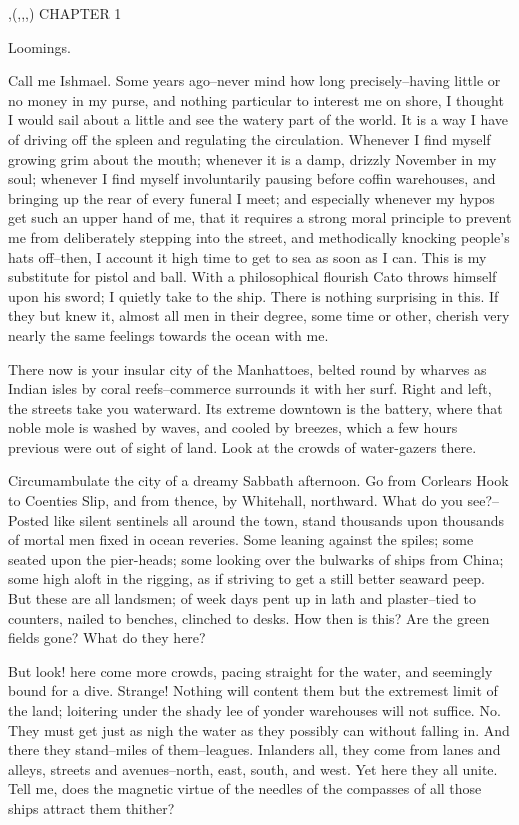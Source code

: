 \fontfam[LMfonts]

\grid \parindent ,\baselineskip(,,,) %
CHAPTER 1

Loomings.

Call me Ishmael. Some years ago--never mind how long
precisely--having little or no money in my purse, and nothing
particular to interest me on shore, I thought I would sail about a
little and see the watery part of the world. It is a way I have of
driving off the spleen and regulating the circulation. Whenever I
find myself growing grim about the mouth; whenever it is a damp,
drizzly November in my soul; whenever I find myself involuntarily
pausing before coffin warehouses, and bringing up the rear of every
funeral I meet; and especially whenever my hypos get such an upper
hand of me, that it requires a strong moral principle to prevent me
from deliberately stepping into the street, and methodically knocking
people's hats off--then, I account it high time to get to sea as soon
as I can. This is my substitute for pistol and ball. With a
philosophical flourish Cato throws himself upon his sword; I quietly
take to the ship. There is nothing surprising in this. If they but
knew it, almost all men in their degree, some time or other, cherish
very nearly the same feelings towards the ocean with me.

There now is your insular city of the Manhattoes, belted round by
wharves as Indian isles by coral reefs--commerce surrounds it with
her surf. Right and left, the streets take you waterward. Its
extreme downtown is the battery, where that noble mole is washed by
waves, and cooled by breezes, which a few hours previous were out of
sight of land. Look at the crowds of water-gazers there.

Circumambulate the city of a dreamy Sabbath afternoon. Go from
Corlears Hook to Coenties Slip, and from thence, by Whitehall,
northward. What do you see?--Posted like silent sentinels all around
the town, stand thousands upon thousands of mortal men fixed in ocean
reveries. Some leaning against the spiles; some seated upon the
pier-heads; some looking over the bulwarks of ships from China; some
high aloft in the rigging, as if striving to get a still better
seaward peep. But these are all landsmen; of week days pent up in
lath and plaster--tied to counters, nailed to benches, clinched to
desks. How then is this? Are the green fields gone? What do they
here?

But look! here come more crowds, pacing straight for the water, and
seemingly bound for a dive. Strange! Nothing will content them but
the extremest limit of the land; loitering under the shady lee of
yonder warehouses will not suffice. No. They must get just as nigh
the water as they possibly can without falling in. And there they
stand--miles of them--leagues. Inlanders all, they come from lanes
and alleys, streets and avenues--north, east, south, and west. Yet
here they all unite. Tell me, does the magnetic virtue of the
needles of the compasses of all those ships attract them thither?

